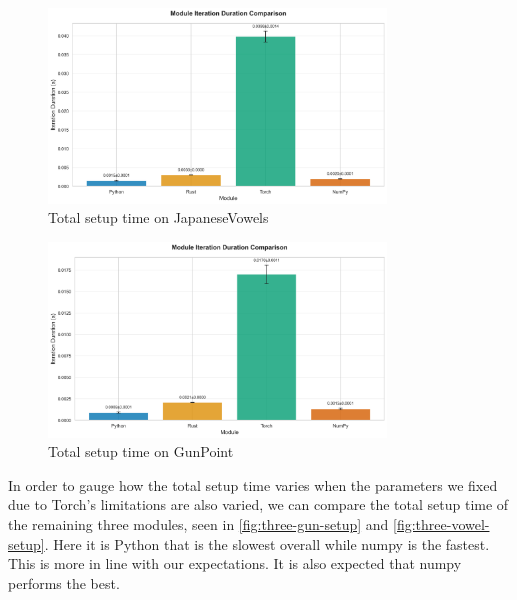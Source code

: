 \documentclass[review]{AIM_report}
\begin{document}
\newcommand{\figsize}{0.8}
\begin{figure}[H]
    \centering
    \includegraphics[width=\figsize\textwidth]{files/benchmarking/iteration/four/vowel.png}
    \caption{Total setup time on JapaneseVowels}
    \label{fig:four-vowel-setup}
\end{figure}
\begin{figure}[H]
    \centering
    \includegraphics[width=\figsize\textwidth]{files/benchmarking/iteration/four/gun.png}
    \caption{Total setup time on GunPoint}
    \label{fig:four-gun-setup}
\end{figure}

In order to gauge how the total setup time varies when the parameters we fixed due to Torch's limitations are also varied, we can compare the total setup time of the remaining three modules, seen in \autoref{fig:three-gun-setup} and \autoref{fig:three-vowel-setup}. Here it is Python that is the slowest overall while numpy is the fastest. This is more in line with our expectations. It is also expected that numpy performs the best.
\end{document}
